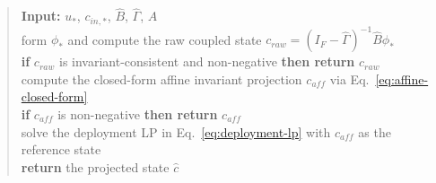 \documentclass[a4paper,fleqn]{cas-sc}
\newenvironment{revblock}{\begingroup\color{revDefault}}{\endgroup}
\newenvironment{revblockr127}{\begingroup\color{revRoneTwentySeven}}{\endgroup}
\begin{document}
\begin{revblock}
\begin{revblockr127}
\begin{minipage}{\textwidth}
\begin{quote}
\begin{tabbing}
\textbf{Input:} $u_*$, $c_{in,*}$, $\widehat{B}$, $\widehat{\Gamma}$, $A$ \\
form $\phi_*$ and compute the raw coupled state $c_{raw} = (I_F - \widehat{\Gamma})^{-1}\widehat{B}\phi_*$ \\
\textbf{if} $c_{raw}$ is invariant-consistent and non-negative \textbf{then return} $c_{raw}$ \\
compute the closed-form affine invariant projection $c_{aff}$ via Eq.~\eqref{eq:affine-closed-form} \\
\textbf{if} $c_{aff}$ is non-negative \textbf{then return} $c_{aff}$ \\
solve the deployment LP in Eq.~\eqref{eq:deployment-lp} with $c_{aff}$ as the reference state \\
\textbf{return} the projected state $\hat{c}$
\end{tabbing}
\end{quote}
\end{minipage}

\end{revblockr127}

\end{revblock}
\end{document}
